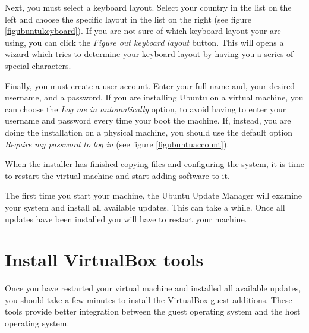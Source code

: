 \documentclass[draft,ebook,10pt,twoside,openright]{memoir}
\begin{document}

Next, you must select a keyboard layout. Select your country in the list on the left and choose the specific layout in the list on the right (see figure \ref{figubuntukeyboard}). If you are not sure of which keyboard layout your are using, you can click the \emph{Figure out keyboard layout} button. This will opens a wizard which tries to determine your keyboard layout by having you a series of special characters.


Finally, you must create a user account. Enter your full name and, your desired username, and a password. If you are installing Ubuntu on a virtual machine, you can choose the \emph{Log me in automatically} option, to avoid having to enter your username and password every time your boot the machine. If, instead, you are doing the installation on a physical machine, you should use the default option \emph{Require my password to log in} (see figure \ref{figubuntuaccount}).


When the installer has finished copying files and configuring the system, it is time to restart the virtual machine and start adding software to it.

The first time you start your machine, the Ubuntu Update Manager will examine your system and install all available updates. This can take a while. Once all updates have been installed you will have to restart your machine.


\section{Install VirtualBox tools} \label{secinstallvirtualboxtools}

Once you have restarted your virtual machine and installed all available updates, you should take a few minutes to install the VirtualBox guest additions. These tools provide better integration between the guest operating system and the host operating system.
\end{document}
